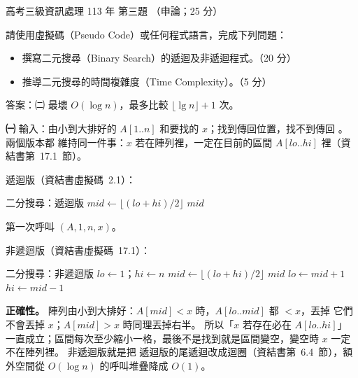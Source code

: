 \begin{pastexam}[label={px:gk3-113-ds-03}]{高考三級資訊處理 113 年 第三題}
（申論；25 分）

請使用虛擬碼（Pseudo Code）或任何程式語言，完成下列問題：
\begin{itemize}[leftmargin=2.2em, nosep]
\item[㈠] 撰寫二元搜尋（Binary Search）的遞迴及非遞迴程式。（20 分）
\item[㈡] 推導二元搜尋的時間複雜度（Time Complexity）。（5 分）
\end{itemize}
\end{pastexam}

\begin{pastsoln}
答案：㈡ 最壞 $O(\log n)$，最多比較 $\lfloor \lg n \rfloor + 1$ 次。

\textbf{㈠} 輸入：由小到大排好的 $A[1..n]$ 和要找的 $x$；找到傳回位置，找不到傳回 \NIL。 兩個版本都
維持同一件事：$x$ 若在陣列裡，一定在目前的區間 $A[\mathit{lo}..\mathit{hi}]$ 裡（資結書第~17.1~節）。

遞迴版（資結書虛擬碼~2.1）：
\begin{pseudo}{二分搜尋：遞迴版}
        \State \Return \NIL {}
    \EndIf
    \State $\mathit{mid} \gets \lfloor (\mathit{lo} + \mathit{hi}) / 2 \rfloor$
        \State \Return $\mathit{mid}$
        \State \Return {}
    \Else
        \State \Return {}
    \EndIf
\EndFunction
\end{pseudo}
第一次呼叫 $(A, 1, n, x)$。

非遞迴版（資結書虛擬碼~17.1）：
\begin{pseudo}{二分搜尋：非遞迴版}
    \State $\mathit{lo} \gets 1$；$\mathit{hi} \gets n$
        \State $\mathit{mid} \gets \lfloor (\mathit{lo} + \mathit{hi}) / 2 \rfloor$
            \State \Return $\mathit{mid}$
            \State $\mathit{lo} \gets \mathit{mid} + 1$ 
        \Else
            \State $\mathit{hi} \gets \mathit{mid} - 1$ 
        \EndIf
    \EndWhile
    \State \Return \NIL
\EndFunction
\end{pseudo}
\textbf{正確性。} 陣列由小到大排好：$A[\mathit{mid}] < x$ 時，$A[\mathit{lo}..\mathit{mid}]$ 都 $< x$，丟掉
它們不會丟掉 $x$；$A[\mathit{mid}] > x$ 時同理丟掉右半。 所以「$x$ 若存在必在 $A[\mathit{lo}..\mathit{hi}]$」
一直成立；區間每次至少縮小一格，最後不是找到就是區間變空，變空時 $x$ 一定不在陣列裡。 非遞迴版就是把
遞迴版的尾遞迴改成迴圈（資結書第~6.4~節），額外空間從 $O(\log n)$ 的呼叫堆疊降成 $O(1)$。


\end{pastsoln}
